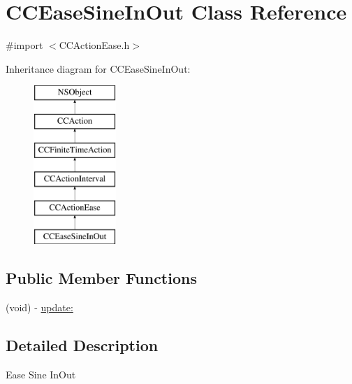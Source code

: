 \hypertarget{interface_c_c_ease_sine_in_out}{\section{C\-C\-Ease\-Sine\-In\-Out Class Reference}
\label{interface_c_c_ease_sine_in_out}
}


{\ttfamily \#import $<$C\-C\-Action\-Ease.\-h$>$}

Inheritance diagram for C\-C\-Ease\-Sine\-In\-Out\-:\begin{figure}[H]
\begin{center}
\leavevmode
\includegraphics[height=6.000000cm]{interface_c_c_ease_sine_in_out}
\end{center}
\end{figure}
\subsection*{Public Member Functions}
\begin{DoxyCompactItemize}
\item 
(void) -\/ \hyperlink{interface_c_c_ease_sine_in_out_a14d22c8e48c0fbc167ce1d9927dfefd4}{update\-:}
\end{DoxyCompactItemize}


\subsection{Detailed Description}
Ease Sine In\-Out 

